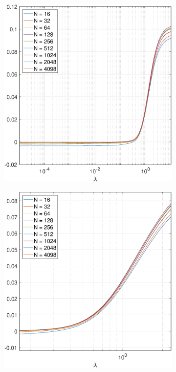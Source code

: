 \documentclass[12pt]{article}
\begin{document}
\begin{figure}
	\centering
	\begin{subfigure}[b]{0.4\textwidth}
        \includegraphics[width=\textwidth]{Figures/MDPfunctions_F1_S15_W100.eps}
        \caption{}
        \label{fig:MDPfunctions_notzoomed}
    \end{subfigure}
    \begin{subfigure}[b]{0.4\textwidth}
        \includegraphics[width=\textwidth]{Figures/MDPfunctions_F1_S15_W100_zoomed.eps}
        \caption{}
        \label{fig:MDPfunctions_zoomed}
    \end{subfigure}
    \caption{}
\label{fig:MDPfunctions}
\end{figure}





\end{document}
